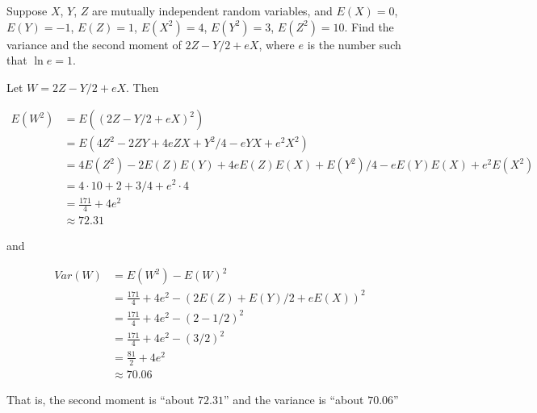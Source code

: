 \begin{problem}[Handout 9, \# 3]
  Suppose \(X\), \(Y\), \(Z\) are mutually independent random variables,
  and \(E(X)=0\), \(E(Y)=-1\), \(E(Z)=1\), \(E(X^2)=4\), \(E(Y^2)=3\),
  \(E(Z^2)=10\). Find the variance and the second moment of \(2Z-Y/2+e X\),
  where \(e\) is the number such that \(\ln e=1\).
\end{problem}
\begin{solution}

Let $W = 2Z-Y/2+e X$. Then

\begin{align*}
E(W^2) &= E((2Z-Y/2+e X)^2)\\
&= E(4Z^2 -2ZY + 4eZX + Y^2/4 -eYX + e^2X^2)\\
&= 4E(Z^2) -2E(Z)E(Y) + 4eE(Z)E(X) + E(Y^2)/4 -eE(Y)E(X) + e^2E(X^2)\\
&= 4\cdot 10 + 2  + 3/4  + e^2\cdot 4\\
&= \frac{171}{4} + 4e^2\\
&\approx 72.31
\end{align*}

and

\begin{align*}
Var(W) &= E(W^2) - E(W)^2 \\
&= \frac{171}{4} + 4e^2 - (2E(Z) + E(Y)/2 +eE(X))^2\\
&= \frac{171}{4} + 4e^2 - (2 -1/2)^2\\
&= \frac{171}{4} + 4e^2 - (3/2)^2\\
&= \frac{81}{2} +4e^2\\
&\approx 70.06
\end{align*}

That is, the second moment is ``about $72.31$'' and the variance is ``about
$70.06$''

\end{solution}
\newpage

